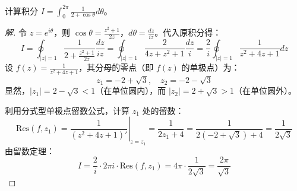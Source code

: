 \begin{example}
	计算积分 $I = \int_{0}^{2\pi} \frac{1}{2 + \cos\theta} d\theta$。
\end{example}
\begin{proof}[解]
	令 $z = e^{i\theta}$，则 $\cos\theta = \frac{z^2+1}{2z}$，$d\theta = \frac{dz}{iz}$。代入原积分得：
	$$ I = \oint_{|z|=1} \frac{1}{2 + \frac{z^2+1}{2z}} \frac{dz}{iz} = \oint_{|z|=1} \frac{2}{4z + z^2 + 1} \frac{dz}{i} = \frac{2}{i} \oint_{|z|=1} \frac{1}{z^2 + 4z + 1} dz $$
	设 $f(z) = \frac{1}{z^2 + 4z + 1}$，其分母的零点（即 $f(z)$ 的单极点）为：
	$$ z_1 = -2 + \sqrt{3}, \quad z_2 = -2 - \sqrt{3} $$
	显然，$|z_1| = 2 - \sqrt{3} < 1$（在单位圆内），而 $|z_2| = 2 + \sqrt{3} > 1$（在单位圆外）。
	
	利用分式型单极点留数公式，计算 $z_1$ 处的留数：
	$$ \text{Res}(f, z_1) = \left. \frac{1}{(z^2 + 4z + 1)'} \right|_{z=z_1} = \frac{1}{2z_1 + 4} = \frac{1}{2(-2+\sqrt{3}) + 4} = \frac{1}{2\sqrt{3}} $$
	由留数定理：
	$$ I = \frac{2}{i} \cdot 2\pi i \cdot \text{Res}(f, z_1) = 4\pi \cdot \frac{1}{2\sqrt{3}} = \frac{2\pi}{\sqrt{3}} $$
\end{proof}